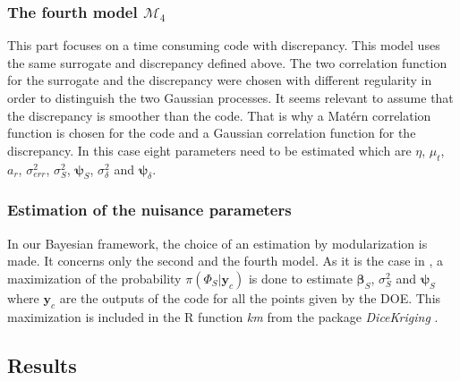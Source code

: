 \documentclass[soumission]{jsfds}
\begin{document}
\subsubsection{The fourth model $\mathcal{M}_4$}

This part focuses on a time consuming code with discrepancy. This model uses the same surrogate and discrepancy defined above. The two correlation function for the surrogate and the discrepancy were chosen with different regularity in order to distinguish the two Gaussian processes. It seems relevant to assume that the discrepancy is smoother than the code. That is why a Matérn correlation function is chosen for the code and a Gaussian correlation function for the discrepancy. In this case eight parameters need to be estimated which are $\eta$, $\mu_t$, $a_r$, $\sigma_{err}^2$, $\sigma_S^2$, $\boldsymbol{\psi}_S$, $\sigma_{\delta}^2$ and $\boldsymbol{\psi}_{\delta}$.



\subsubsection{Estimation of the nuisance parameters}

In our Bayesian framework, the choice of an estimation by modularization is made. It concerns only the second and the fourth model. As it is the case in \citet{kennedy2001}, a maximization of the probability $\pi(\Phi_S|\boldsymbol{y}_c)$ is done to estimate $\boldsymbol{\beta}_S$, $\sigma_S^2$ and $\boldsymbol{\psi}_S$ where $\boldsymbol{y}_c$ are the outputs of the code for all the points given by the DOE. This maximization is included in the R function \textit{km} from the package \textit{DiceKriging} \citep{roustant2012}.


\subsection{Results}
\end{document}
